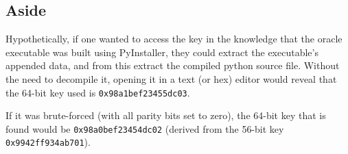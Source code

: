 \documentclass[11pt]{article}
\begin{document}
\begin{multicols*}{2}
        \section{Aside}\label{sec:asside}
        Hypothetically, if one wanted to access the key in the knowledge that the oracle executable was built using PyInstaller, they could extract the executable's appended data, and from this extract the compiled python source file.
        Without the need to decompile it, opening it in a text (or hex) editor would reveal that the 64-bit key used is \texttt{0x98a1bef23455dc03}.

        If it was brute-forced (with all parity bits set to zero), the 64-bit key that is found would be \texttt{0x98a0bef23454dc02} (derived from the 56-bit key \texttt{0x9942ff934ab701}).
    \end{multicols*}

    
    
\end{document}
